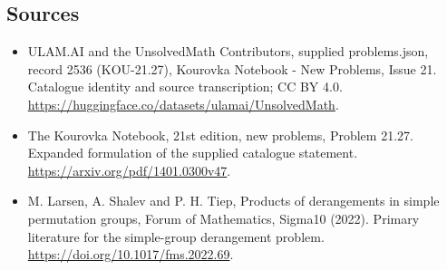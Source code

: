 \documentclass[11pt,a4paper]{article}
\begin{document}
\subsection{Sources}
\begin{itemize}
\item[S1] ULAM.AI and the UnsolvedMath Contributors, supplied problems.json, record 2536 (KOU-21.27), Kourovka Notebook - New Problems, Issue 21. Catalogue identity and source transcription; CC BY 4.0.
\url{https://huggingface.co/datasets/ulamai/UnsolvedMath}.
\item[S2] The Kourovka Notebook, 21st edition, new problems, Problem 21.27. Expanded formulation of the supplied catalogue statement.
\url{https://arxiv.org/pdf/1401.0300v47}.
\item[S3] M. Larsen, A. Shalev and P. H. Tiep, Products of derangements in simple permutation groups, Forum of Mathematics, Sigma10 (2022). Primary literature for the simple-group derangement problem.
\url{https://doi.org/10.1017/fms.2022.69}.
\end{itemize}
\end{document}

